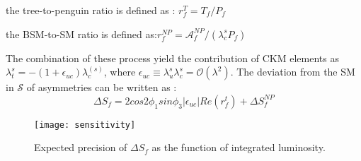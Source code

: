 \textbullet \space the tree-to-penguin ratio is defined as : $r^T_f=T_f/P_f$

\textbullet \space the BSM-to-SM ratio is defined as:$ r_f^{NP}=\mathcal{A}^{NP}_f/(\lambda^s_c P_f)$

The combination of these process yield the contribution of CKM elements as $\lambda_t^s = -(1+\epsilon_{uc})\lambda^{(s)}_c $, where $\epsilon_{uc} \equiv \lambda^s_u \lambda^s_c = \mathcal{O}(\lambda^2)$. The deviation from the SM in $\mathcal{S}$ of asymmetries can be written as \cite{Gronau_2004}: 
\begin{equation}
\Delta S_f=2cos2\phi_1 sin\phi_3 |\epsilon_{uc}| Re(r^t_f) + \Delta S^{NP}_f
\end{equation}

\begin{figure}[H]
	\centering
	\texttt{[image: sensitivity]}
	\caption{Expected precision of $\Delta S_f$ as the function of integrated luminosity.}
\end{figure}

